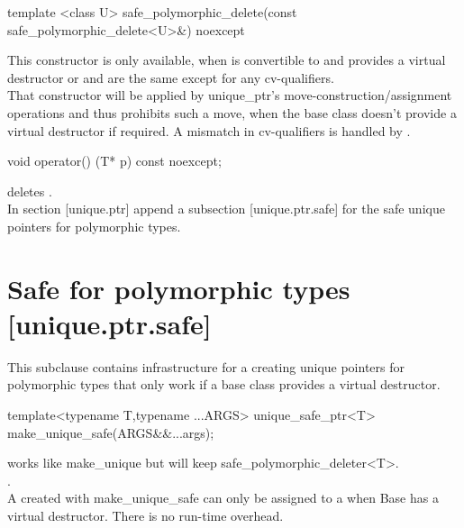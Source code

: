 \documentclass[ebook,11pt,article]{memoir}
\begin{document}
\begin{itemdecl}
template <class U>
safe_polymorphic_delete(const safe_polymorphic_delete<U>&) noexcept 
\end{itemdecl}
\pnum
\effects This constructor is only available, when  is convertible to  and  provides a virtual destructor or  and  are the same except for any cv-qualifiers.
\\
\pnum
\enternote
That constructor will be applied by unique_ptr's move-construction/assignment operations and thus prohibits such a move, when the base class doesn't provide a virtual destructor if required. A mismatch in cv-qualifiers is handled by .
\exitnote

\begin{itemdecl}
     void operator() (T* p) const noexcept;
\end{itemdecl}
\pnum
\effects deletes .
\\

In section [unique.ptr] append a subsection [unique.ptr.safe] for the safe unique pointers for polymorphic types.
\\

\section{Safe  for polymorphic types [unique.ptr.safe]}
\pnum
This subclause contains infrastructure for a creating unique pointers for polymorphic types that only work if a base class provides a virtual destructor.\\

\begin{itemdecl}
template<typename T,typename ...ARGS>
unique_safe_ptr<T> make_unique_safe(ARGS&&...args);
\end{itemdecl}

\pnum
\effects works like make_unique but will keep safe_polymorphic_deleter<T>. 
\\

\pnum
\returns {}.
\\

\pnum
\enternote
A  created with make_unique_safe can only be assigned to a  when Base has a virtual destructor. There is no run-time overhead.
\exitnote
\end{document}
